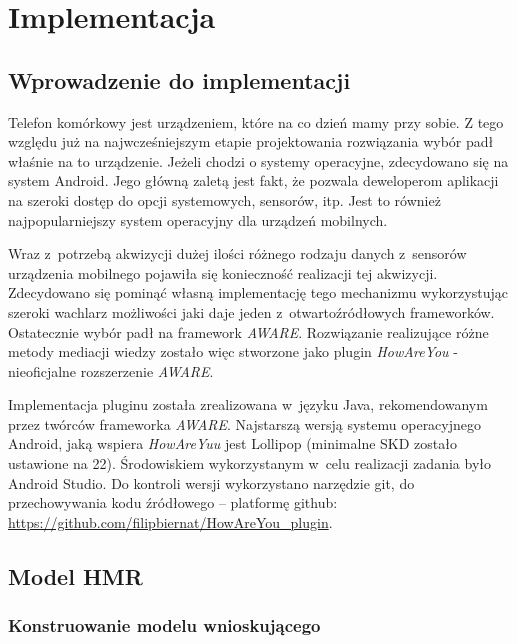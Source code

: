 \chapter{Implementacja}
\label{cha:implementacja}


\section{Wprowadzenie do implementacji}
\label{sec:wprowadzenieDoImplementacji}

Telefon komórkowy jest urządzeniem, które na co dzień mamy przy sobie. Z tego względu już na najwcześniejszym etapie projektowania rozwiązania wybór padł właśnie na to urządzenie. Jeżeli chodzi o systemy operacyjne, zdecydowano się na system Android. Jego główną zaletą jest fakt, że pozwala deweloperom aplikacji na szeroki dostęp do opcji systemowych, sensorów, itp. Jest to również najpopularniejszy system operacyjny dla urządzeń mobilnych.

Wraz z~potrzebą akwizycji dużej ilości różnego rodzaju danych z~sensorów urządzenia mobilnego pojawiła się konieczność realizacji tej akwizycji. Zdecydowano się pominąć własną implementację tego mechanizmu wykorzystując szeroki wachlarz możliwości jaki daje jeden z~otwartoźródłowych frameworków. Ostatecznie wybór padł na framework \textit{AWARE}. Rozwiązanie realizujące różne metody mediacji wiedzy zostało więc stworzone jako plugin \textit{HowAreYou} - nieoficjalne rozszerzenie \textit{AWARE}.

Implementacja pluginu została zrealizowana w~języku Java, rekomendowanym przez twórców frameworka \textit{AWARE}\cite{AwareFramework}. Najstarszą wersją systemu operacyjnego Android, jaką wspiera \textit{HowAreYuu} jest Lollipop (minimalne SKD zostało ustawione na 22). Środowiskiem wykorzystanym w~celu realizacji zadania było Android Studio. Do kontroli wersji wykorzystano narzędzie git, do przechowywania kodu źródłowego -- platformę github: \url{https://github.com/filipbiernat/HowAreYou_plugin}.


\section{Model HMR}
\label{sec:modelHmr2}

\subsection{Konstruowanie modelu wnioskującego}

